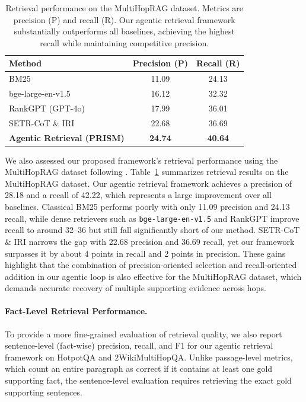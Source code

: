 \documentclass{article} %
\begin{document}
\begin{table}[t]
\centering
\small
\caption{Retrieval performance on the MultiHopRAG dataset. 
Metrics are precision (P) and recall (R). 
Our agentic retrieval framework substantially outperforms all baselines, 
achieving the highest recall while maintaining competitive precision.}
\begin{tabular}{l|c|c}
\toprule
\textbf{Method} & \textbf{Precision (P)} & \textbf{Recall (R)} \\
\midrule
BM25 \citep{robertson2009probabilistic} & 11.09 & 24.13 \\
{bge-large-en-v1.5} \citep{xiao2023cpack} & 16.12 & 32.32 \\
RankGPT (GPT-4o) \citep{sun-etal-2023-chatgpt} & 17.99 & 36.01 \\
SETR-CoT \& IRI \citep{lee-etal-2025-shifting} & 22.68 & 36.69 \\
\midrule
\textbf{Agentic Retrieval (PRISM)} & \textbf{24.74} & \textbf{40.64} \\
\bottomrule
\end{tabular}
\label{tab:retrieval_multihoprag}
\end{table}


We also assessed our proposed framework’s retrieval performance using the MultiHopRAG dataset  \citep{tang2024multihoprag} following \citet{lee-etal-2025-shifting}. Table~\ref{tab:retrieval_multihoprag} summarizes retrieval results on the MultiHopRAG dataset. Our agentic retrieval framework achieves a precision of 28.18 and a recall of 42.22, which represents a large improvement over all baselines. Classical BM25 \citep{robertson2009probabilistic} performs poorly with only 11.09 precision and 24.13 recall, while dense retrievers such as \texttt{bge-large-en-v1.5} \citep{xiao2023cpack} and RankGPT \citep{sun-etal-2023-chatgpt} improve recall to around 32--36 but still fall significantly short of our method. SETR-CoT \& IRI \citep{lee-etal-2025-shifting} narrows the gap with 22.68 precision and 36.69 recall, yet our framework surpasses it by about 4 points in recall and 2 points in precision. These gains highlight that the combination of precision-oriented selection and recall-oriented addition in our agentic loop is also effective for the MultiHopRAG dataset, which demands accurate recovery of multiple supporting evidence across hops. 

\paragraph{Fact-Level Retrieval Performance.}
To provide a more fine-grained evaluation of retrieval quality, we also report 
sentence-level (fact-wise) precision, recall, and F1 for our agentic retrieval framework 
on HotpotQA and 2WikiMultiHopQA. Unlike passage-level metrics, which count an entire paragraph  as correct if it contains at least one gold supporting fact, the sentence-level evaluation  requires retrieving the exact gold supporting sentences.
\end{document}
